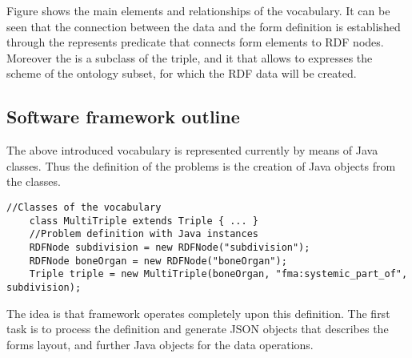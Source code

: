 

Figure  shows the main elements and relationships of the vocabulary. It can be seen that the connection between the data and the form definition is established through the represents predicate that connects form elements to RDF nodes. Moreover the  is a subclass of the triple, and it that allows to expresses the scheme of the ontology subset, for which the RDF data will be created.


\subsection{Software framework outline} \label{[332}


The above introduced vocabulary is represented currently by means of Java classes. Thus the definition of the problems is the creation of Java objects from the classes. 


\begin{lstlisting}[captionpos=b, caption=Vocabulary implementation, label={sparqlExisting},
basicstyle=\footnotesize,frame=single]
	//Classes of the vocabulary
	class MultiTriple extends Triple { ... }
	//Problem definition with Java instances
	RDFNode subdivision = new RDFNode("subdivision");
	RDFNode boneOrgan = new RDFNode("boneOrgan");
	Triple triple = new MultiTriple(boneOrgan, "fma:systemic_part_of", subdivision);
\end{lstlisting}


The idea is that framework operates completely upon this definition. The first task is to process the definition and generate JSON objects that describes the forms layout, and further Java objects for the data operations.




